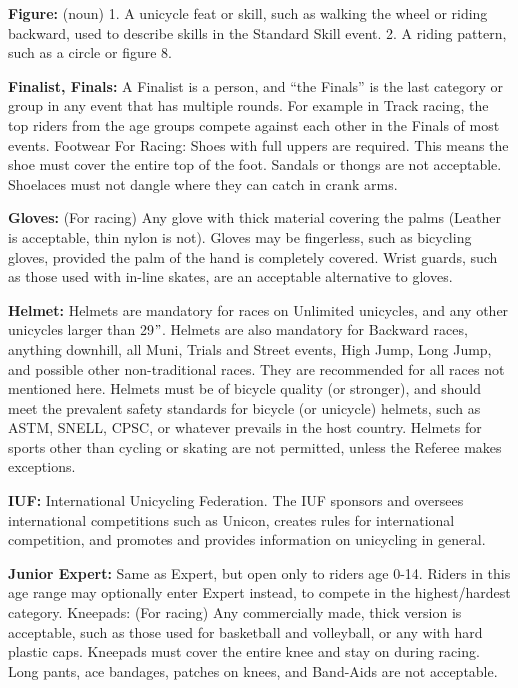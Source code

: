 \textbf{Figure:} (noun) 1. A unicycle feat or skill, such as walking the wheel or riding backward, used to describe skills in the Standard Skill event.
2. A riding pattern, such as a circle or figure 8.

\textbf{Finalist, Finals:} A Finalist is a person, and ``the Finals'' is the last category or group in any event that has multiple rounds.
For example in Track racing, the top riders from the age groups compete against each other in the Finals of most events.
{Footwear For Racing:} Shoes with full uppers are required.
This means the shoe must cover the entire top of the foot.
Sandals or thongs are not acceptable.
Shoelaces must not dangle where they can catch in crank arms.

\textbf{Gloves:} (For racing) Any glove with thick material covering the palms (Leather is acceptable, thin nylon is not).
Gloves may be fingerless, such as bicycling gloves, provided the palm of the hand is completely covered.
Wrist guards, such as those used with in-line skates, are an acceptable alternative to gloves.

\textbf{Helmet:} Helmets are mandatory for races on Unlimited unicycles, and any other unicycles larger than 29$"$.
Helmets are also mandatory for Backward races, anything downhill, all Muni, Trials and Street events, High Jump, Long Jump, and possible other non-traditional races.
They are recommended for all races not mentioned here.
Helmets must be of bicycle quality (or stronger), and should meet the prevalent safety standards for bicycle (or unicycle) helmets, such as ASTM, SNELL, CPSC, or whatever prevails in the host country.
Helmets for sports other than cycling or skating are not permitted, unless the Referee makes exceptions.

\textbf{IUF:} International Unicycling Federation.
The IUF sponsors and oversees international competitions such as Unicon, creates rules for international competition, and promotes and provides information on unicycling in general.

\textbf{Junior Expert:} Same as Expert, but open only to riders age 0-14.
Riders in this age range may optionally enter Expert instead, to compete in the highest/hardest category.
{Kneepads:} (For racing) Any commercially made, thick version is acceptable, such as those used for basketball and volleyball, or any with hard plastic caps.
Kneepads must cover the entire knee and stay on during racing.
Long pants, ace bandages, patches on knees, and Band-Aids are not acceptable.

